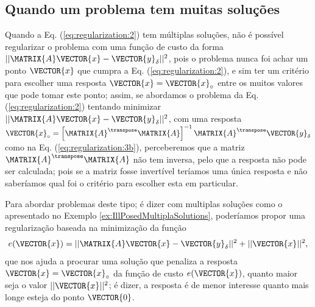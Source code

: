 \subsection{Quando um problema \illposed tem muitas soluções}
Quando a Eq. (\ref{eq:regularization:2}) tem múltiplas soluções, 
não é possível regularizar o problema com uma função de custo da forma 
$||\MATRIX{A}\VECTOR{x}-\VECTOR{y}_{\delta}||^2$,
pois o problema nunca foi achar um ponto $\VECTOR{x}$ que cumpra a Eq. (\ref{eq:regularization:2}), 
e sim ter um critério para escolher uma resposta $\VECTOR{x}=\VECTOR{x}_{\circ}$ entre os muitos valores que pode tomar este ponto;
assim, se abordamos o problema da Eq. (\ref{eq:regularization:2}) tentando minimizar $||\MATRIX{A}\VECTOR{x}-\VECTOR{y}_{\delta}||^2$,
com uma resposta $\VECTOR{x}_{\circ} = \left[ \MATRIX{A}^{\transpose} \MATRIX{A} \right]^{-1}\MATRIX{A}^{\transpose}\VECTOR{y}_{\delta}$
como na Eq. (\ref{eq:regularization:3b}),
perceberemos que a matriz $\MATRIX{A}^{\transpose}\MATRIX{A}$ não tem inversa,
pelo que a resposta não pode ser calculada;
pois se a matriz fosse invertível teríamos uma única resposta e não saberíamos
qual foi o critério para escolher esta em particular.

Para abordar problemas deste tipo; é dizer com multiplas soluções
como o apresentado no Exemplo \ref{ex:IllPosedMultiplaSolutions}, 
poderíamos propor uma regularização baseada na minimização
da função 
\begin{equation}\label{eq:regularization:4}
e(\VECTOR{x})=||\MATRIX{A}\VECTOR{x}-\VECTOR{y}_{\delta}||^2+||\VECTOR{x}||^2,
\end{equation}
que nos ajuda a procurar uma solução que penaliza a resposta $\VECTOR{x}=\VECTOR{x}_{\circ}$ da função de custo $e(\VECTOR{x})$, 
quanto maior seja o valor $||\VECTOR{x}||^2$;
é dizer, a resposta é de menor interesse quanto mais longe esteja do ponto $\VECTOR{0}$.

